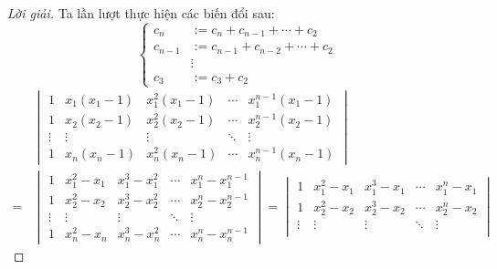 \begin{proof}[Lời giải]
    Ta lần lượt thực hiện các biến đổi sau:
    \[
        \begin{cases}
            c_{n}   & := c_{n} + c_{n-1} + \cdots + c_{2}   \\
            c_{n-1} & := c_{n-1} + c_{n-2} + \cdots + c_{2} \\
                    & \vdots                                \\
            c_{3}   & := c_{3} + c_{2}
        \end{cases}
    \]
    \begingroup{}
    \allowdisplaybreaks{}
    \begin{align*}
          & \begin{vmatrix}
                1      & x_{1}(x_{1} - 1) & x_{1}^{2}(x_{1} - 1) & \cdots & x_{1}^{n-1}(x_{1} - 1) \\
                1      & x_{2}(x_{2} - 1) & x_{2}^{2}(x_{2} - 1) & \cdots & x_{2}^{n-1}(x_{2} - 1) \\
                \vdots & \vdots           & \vdots               & \ddots & \vdots                 \\
                1      & x_{n}(x_{n} - 1) & x_{n}^{2}(x_{n} - 1) & \cdots & x_{n}^{n-1}(x_{n} - 1)
            \end{vmatrix}                                                                                                                                               \\
        = &
        \begin{vmatrix}
            1      & x_{1}^{2} - x_{1} & x_{1}^{3} - x_{1}^{2} & \cdots & x_{1}^{n} - x_{1}^{n-1} \\
            1      & x_{2}^{2} - x_{2} & x_{2}^{3} - x_{2}^{2} & \cdots & x_{2}^{n} - x_{2}^{n-1} \\
            \vdots & \vdots            & \vdots                & \ddots & \vdots                  \\
            1      & x_{n}^{2} - x_{n} & x_{n}^{3} - x_{n}^{2} & \cdots & x_{n}^{n} - x_{n}^{n-1}
        \end{vmatrix}
        =
        \begin{vmatrix}
            1      & x_{1}^{2} - x_{1} & x_{1}^{3} - x_{1} & \cdots & x_{1}^{n} - x_{1} \\
            1      & x_{2}^{2} - x_{2} & x_{2}^{3} - x_{2} & \cdots & x_{2}^{n} - x_{2} \\
            \vdots & \vdots            & \vdots            & \ddots & \vdots            \\

\end{vmatrix}
\end{align*}
\end{proof}

